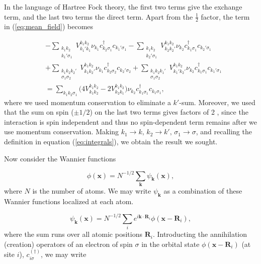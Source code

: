 \documentclass[10pt, twocolumn, twoside]{article}
\begin{document}
In the language of Hartree Fock theory, the first two terms give the exchange term, and the last two terms the direct term. Apart from the $\frac{1}{2}$ factor, the term in (\ref{eq:mean_field}) becomes

\begin{equation}
\begin{split}
&- \sum_{\substack{k_1 k_2 \\ k_1' \sigma_1}} V_{k_1' k_1}^{k_1 k_2} \nu_{k_1} c_{k_2 \sigma_1}^\dagger c_{k_1' \sigma_1}  - \sum_{\substack{k_1 k_2 \\ k_2' \sigma_1}} V_{k_2 k_2'}^{k_1 k_2} \nu_{k_2} c_{k_1 \sigma_1}^\dagger c_{k_2' \sigma_1} \\
&+ \sum_{\substack{k_1 k_2 k_2' \\ \sigma_1 \sigma_2}} V_{k_1 k_2'}^{k_1 k_2} \nu_{k_1} c_{k_2 \sigma_2}^\dagger c_{k_2' \sigma_2}  + \sum_{\substack{k_1 k_2 k_1' \\  \sigma_1 \sigma_2}} V_{k_1' k_2'}^{k_1 k_2} \nu_{k_2} c_{k_1 \sigma_1}^\dagger c_{k_1' \sigma_1} \\
&= \sum_{k_1 k_2 \sigma_1} \bigg( 4 V_{k_1 k_2}^{k_1 k_2} - 2  V_{k_2 k_1}^{k_1 k_2}  \bigg) \nu_{k_2} c_{k_1 \sigma_1}^\dagger c_{k_1 \sigma_1}
,
\end{split}
\end{equation}
where we used momentum conservation to eliminate a $k'$-sum. Moreover, we used that the sum on spin ($\pm 1/2$) on the last two terms gives factors of 2 , since the interaction is spin independent and thus no spin-dependent term remains after we use momentum conservation. Making $k_1 \rightarrow k , \, k_2 \rightarrow k', \, \sigma_1 \rightarrow \sigma$, and recalling the definition in equation (\ref{eq:integrals}), we obtain the result we sought.

Now consider the Wannier functions

\begin{equation}
\phi(\bm x) = N^{-1/2} \sum_{\bm k} \psi_{\bm k} (\bm x) , 
\end{equation}
where $N$ is the number of atoms. We may write $\psi_{\bm k}$ as a  combination of these Wannier functions localized at each atom.

\begin{equation}
\psi_{\bm k} (\bm x) = N^{-1/2} \sum_i e^{i \bm k \cdot \bm R_i} \phi (\bm x - \bm R_i) ,
\end{equation}
where the sum runs over all atomic positions $\bm R_i$. Introducting the annihilation (creation) operators of an electron of spin $\sigma$ in the orbital state $\phi (\bm x - \bm R_i)$ (at site $i$), $c_{i\sigma}^{(\dagger)}$, we may write
\end{document}
